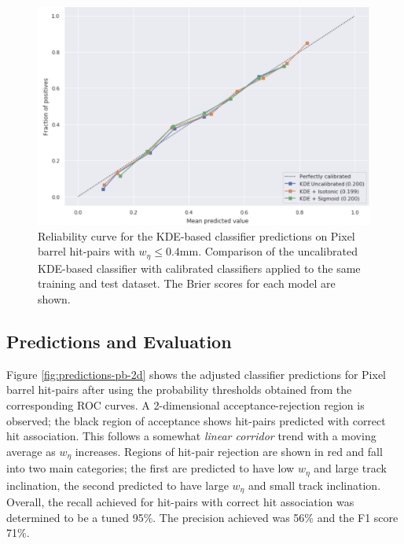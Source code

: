 \begin{figure}[!htbp]
\centering
\includegraphics[width=0.88\linewidth]{images/4-ml-based-predictor/calibration.png}
\caption{Reliability curve for the KDE-based classifier predictions on Pixel barrel hit-pairs with $ w_{\eta} \leq 0.4$mm. Comparison of the uncalibrated KDE-based classifier with calibrated classifiers applied to the same training and test dataset. The Brier scores for each model are shown.}
\label{fig:calibration}
\end{figure}


\subsection{Predictions and Evaluation}

Figure \ref{fig:predictions-pb-2d} shows the adjusted classifier predictions for Pixel barrel hit-pairs after using the probability thresholds obtained from the corresponding ROC curves. A 2-dimensional acceptance-rejection region is observed; the black region of acceptance shows hit-pairs predicted with correct hit association. This follows a somewhat \textit{linear corridor} trend with a moving average as $w_{\eta}$ increases. Regions of hit-pair rejection are shown in red and fall into two main categories; the first are predicted to have low $w_{\eta}$ and large track inclination, the second predicted to have large $w_{\eta}$ and small track inclination. Overall, the recall achieved for hit-pairs with correct hit association was determined to be a tuned 95\%. The precision achieved was 56\% and the F1 score 71\%. 


